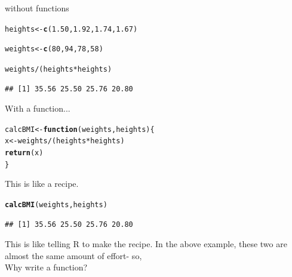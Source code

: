 \documentclass{beamer}\usepackage[]{graphicx}\usepackage[]{color}
\makeatletter
\newcommand{\hlnum}[1]{\textcolor[rgb]{0.686,0.059,0.569}{#1}}%
\newcommand{\hlopt}[1]{\textcolor[rgb]{0,0,0}{#1}}%
\newcommand{\hlstd}[1]{\textcolor[rgb]{0.345,0.345,0.345}{#1}}%
\newcommand{\hlkwa}[1]{\textcolor[rgb]{0.161,0.373,0.58}{\textbf{#1}}}%
\newcommand{\hlkwb}[1]{\textcolor[rgb]{0.69,0.353,0.396}{#1}}%
\newcommand{\hlkwc}[1]{\textcolor[rgb]{0.333,0.667,0.333}{#1}}%
\newcommand{\hlkwd}[1]{\textcolor[rgb]{0.737,0.353,0.396}{\textbf{#1}}}%
\newenvironment{kframe}{%
 \def\at@end@of@kframe{}%
 \ifinner\ifhmode%
  \def\at@end@of@kframe{\end{minipage}}%
  \begin{minipage}{\columnwidth}%
 \fi\fi%
 \def\FrameCommand##1{\hskip\@totalleftmargin \hskip-\fboxsep
 \colorbox{shadecolor}{##1}\hskip-\fboxsep
     \hskip-\linewidth \hskip-\@totalleftmargin \hskip\columnwidth}%
 \MakeFramed {\advance\hsize-\width
   \@totalleftmargin\z@ \linewidth\hsize
   \@setminipage}}%
 {\par\unskip\endMakeFramed%
 \at@end@of@kframe}
\newenvironment{knitrout}{}{} %
\makeatother
\begin{document}
\begin{frame}[fragile]{without functions}
\begin{knitrout}
\color{fgcolor}\begin{kframe}
\begin{alltt}
\hlstd{heights} \hlkwb{<-} \hlkwd{c}\hlstd{(}\hlnum{1.50}\hlstd{,} \hlnum{1.92}\hlstd{,} \hlnum{1.74}\hlstd{,} \hlnum{1.67}\hlstd{)}

\hlstd{weights} \hlkwb{<-} \hlkwd{c}\hlstd{(}\hlnum{80}\hlstd{,} \hlnum{94}\hlstd{,} \hlnum{78}\hlstd{,} \hlnum{58}\hlstd{)}

\hlstd{weights} \hlopt{/} \hlstd{( heights} \hlopt{*} \hlstd{heights )}
\end{alltt}
\begin{verbatim}
## [1] 35.56 25.50 25.76 20.80
\end{verbatim}
\end{kframe}
\end{knitrout}
\end{frame}

\begin{frame}[fragile]{With a function...}
\begin{knitrout}
\color{fgcolor}\begin{kframe}
\begin{alltt}
\hlstd{calcBMI} \hlkwb{<-} \hlkwa{function} \hlstd{(}\hlkwc{weights}\hlstd{,} \hlkwc{heights}\hlstd{) \{}
      \hlstd{x} \hlkwb{<-} \hlstd{weights} \hlopt{/} \hlstd{( heights} \hlopt{*} \hlstd{heights )}
      \hlkwd{return} \hlstd{(x)}
\hlstd{\}}
\end{alltt}
\end{kframe}
\end{knitrout}
This is like a recipe.
\begin{knitrout}
\color{fgcolor}\begin{kframe}
\begin{alltt}
\hlkwd{calcBMI}\hlstd{(weights, heights)}
\end{alltt}
\begin{verbatim}
## [1] 35.56 25.50 25.76 20.80
\end{verbatim}
\end{kframe}
\end{knitrout}
This is like telling R to make the recipe.
\linebreak
\linebreak
In the above example, these two are almost the same amount of effort- so,\\
Why write a function?\\
\end{frame}
\end{document}
